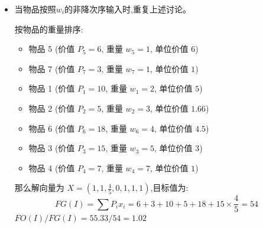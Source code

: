 \documentclass[../../main.tex]{subfiles}
\begin{document}
\begin{solution}
\begin{itemize}
计算\( FO(I) \):
按物品的单位价值排序:
\begin{itemize}
    \item 物品 5 (价值 \( P_5 =  6 \), 重量 \( w_5 = 1 \), 单位价值 \(6   \))
    \item 物品 1 (价值 \( P_1 = 10 \), 重量 \( w_1 = 2 \), 单位价值 \(5   \))
    \item 物品 6 (价值 \( P_6 = 18 \), 重量 \( w_6 = 4 \), 单位价值 \(4.5 \))
    \item 物品 3 (价值 \( P_3 = 15 \), 重量 \( w_3 = 5 \), 单位价值 \(3   \))  
    \item 物品 7 (价值 \( P_7 =  3 \), 重量 \( w_7 = 1 \), 单位价值 \(3   \))

    \item 物品 2 (价值 \( P_2 =  5 \), 重量 \( w_2 = 3 \), 单位价值 \(1.66\))
    \item 物品 4 (价值 \( P_4 =  7 \), 重量 \( w_4 = 7 \), 单位价值 \(1   \))
\end{itemize}
那么解向量为 \( X = (1, \frac{2}{3}, 1, 0, 1, 1, 1) \),目标值为:
\[
FO(I) = \sum P_i x_i =  6+10+18+15+3+5 \times \frac{2}{3}  = 55.33
\]
\(FO(I)/FG(I) = 55.33/47 = 1.18\)

\item 当物品按照\(w_i\)的非降次序输入时,重复上述讨论。

按物品的重量排序:
\begin{itemize}
    \item 物品 5 (价值 \( P_5 =  6 \), 重量 \( w_5 = 1 \), 单位价值 \(6   \))
    \item 物品 7 (价值 \( P_7 =  3 \), 重量 \( w_7 = 1 \), 单位价值 \(1   \))
    \item 物品 1 (价值 \( P_1 = 10 \), 重量 \( w_1 = 2 \), 单位价值 \(5   \))
    \item 物品 2 (价值 \( P_2 =  5 \), 重量 \( w_2 = 3 \), 单位价值 \(1.66\))
    \item 物品 6 (价值 \( P_6 = 18 \), 重量 \( w_6 = 4 \), 单位价值 \(4.5 \))
    \item 物品 3 (价值 \( P_3 = 15 \), 重量 \( w_3 = 5 \), 单位价值 \(3   \))
    \item 物品 4 (价值 \( P_4 =  7 \), 重量 \( w_4 = 7 \), 单位价值 \(1   \))
\end{itemize}
那么解向量为 \( X = (1, 1, \frac{4}{5}, 0, 1, 1, 1) \),目标值为:
\[
FG(I) = \sum P_i x_i =  6+3+10+5+18+15 \times \frac{4}{5}  = 54
\]
\(FO(I)/FG(I) = 55.33/54 = 1.02\)
\end{itemize}
\end{solution}
\end{document}
